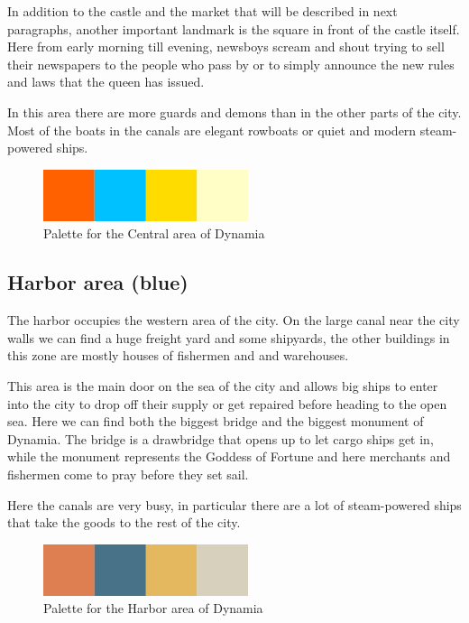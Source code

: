 In addition to the castle and the market that will be described in next paragraphs, another important landmark is the square in front of the castle itself. Here from early morning till evening, newsboys scream and shout trying to sell their newspapers to the people who pass by or to simply announce the new rules and laws that the queen has issued.

In this area there are more guards and demons than in the other parts of the city. Most of the boats in the canals are elegant rowboats or quiet and modern steam-powered ships.

\begin{figure}[H]
  \centering
  \includegraphics[width=6cm]{Images/Palettes/dynamiaCentralArea}
  \caption{Palette for the Central area of Dynamia}
\end{figure}

\subsection{Harbor area (blue)}
The harbor occupies the western area of the city. On the large canal near the city walls we can find a huge freight yard and some shipyards, the  other buildings in this zone are mostly houses of fishermen and and warehouses.

This area is the main door on the sea of the city and allows big ships to enter into the city to drop off their supply or get repaired before heading to the open sea. Here we can find both the biggest bridge and the biggest monument of Dynamia. The bridge is a drawbridge that opens up to let cargo ships get in, while the monument represents the Goddess of Fortune and here merchants and fishermen come to pray before they set sail.

Here the canals are very busy, in particular there are a lot of steam-powered ships that take the goods to the rest of the city.

\begin{figure}[H]
  \centering
  \includegraphics[width=6cm]{Images/Palettes/dynamiaHarborArea}
  \caption{Palette for the Harbor area of Dynamia}
\end{figure}

